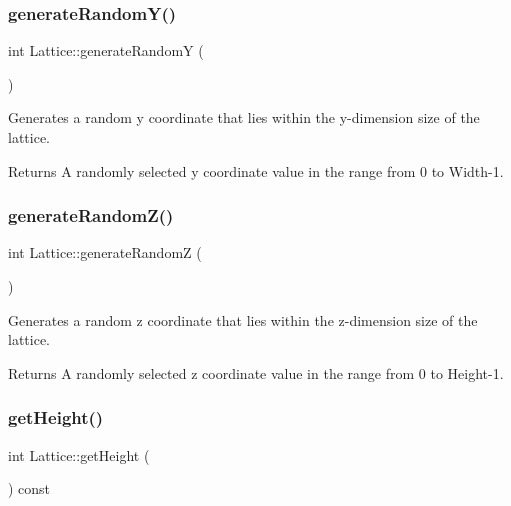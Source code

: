 \subsubsection{\texorpdfstring{generate\+Random\+Y()}{generateRandomY()}}
{\footnotesize\ttfamily int Lattice\+::generate\+RandomY (\begin{DoxyParamCaption}{ }\end{DoxyParamCaption})}



Generates a random y coordinate that lies within the y-\/dimension size of the lattice. 

\begin{DoxyReturn}{Returns}
A randomly selected y coordinate value in the range from 0 to Width-\/1. 
\end{DoxyReturn}
\mbox{\label{class_lattice_a96006397a6ab389fb1eee87fde6e2165}} 
\subsubsection{\texorpdfstring{generate\+Random\+Z()}{generateRandomZ()}}
{\footnotesize\ttfamily int Lattice\+::generate\+RandomZ (\begin{DoxyParamCaption}{ }\end{DoxyParamCaption})}



Generates a random z coordinate that lies within the z-\/dimension size of the lattice. 

\begin{DoxyReturn}{Returns}
A randomly selected z coordinate value in the range from 0 to Height-\/1. 
\end{DoxyReturn}
\mbox{\label{class_lattice_aaa0cba3ab33ac620d9b9f9508c56d1ac}} 
\subsubsection{\texorpdfstring{get\+Height()}{getHeight()}}
{\footnotesize\ttfamily int Lattice\+::get\+Height (\begin{DoxyParamCaption}{ }\end{DoxyParamCaption}) const}



